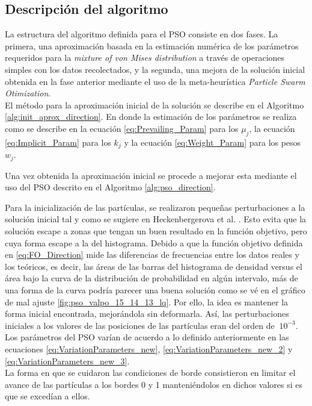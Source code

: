 \subsection{Descripción del algoritmo}
La estructura del algoritmo definida para el PSO consiste en dos fases. La primera, una aproximación basada en la estimación numérica de los parámetros requeridos para la \emph{mixture of von Mises distribution} a través de operaciones simples con los datos recolectados, y la segunda, una mejora de la solución inicial obtenida en la fase anterior mediante el uso de la meta-heurística \emph{Particle Swarm Otimization}. \\
El método para la aproximación inicial de la solución se describe en el Algoritmo \ref{alg:init_aprox_direction}.
En donde la estimación de los parámetros se realiza como se describe en la ecuación \ref{eq:Prevailing_Param} para los $\mu_j$, la ecuación \ref{eq:Implicit_Param} para los $k_j$ y  la ecuación \ref{eq:Weight_Param} para los pesos $w_j$.

Una vez obtenida la aproximación inicial se procede a mejorar esta mediante el uso del PSO descrito en el Algoritmo \ref{alg:pso_direction}.

Para la inicialización de las partículas, se realizaron pequeñas perturbaciones a la solución inicial tal y como se sugiere en Heckenbergerova et al. \cite{Heckenbergerova15}. Esto evita que la solución escape a zonas que tengan un buen resultado en la función objetivo, pero cuya forma escape a la del histograma. Debido a que la función objetivo definida en \ref{eq:FO_Direction} mide las diferencias de frecuencias entre los datos reales y los teóricos, es decir, las áreas de las barras del histograma de densidad versus el área bajo la curva de la distribución de probabilidad en algún intervalo, más de una forma de la curva podría parecer una buena solución como se vé en el gráfico de mal ajuste \ref{fig:pso_valpo_15_14_13_lq}. Por ello, la idea es mantener la forma inicial encontrada, mejorándola sin deformarla. Así, las perturbaciones iniciales a los valores de las posiciones de las partículas eran del orden de $~ 10^{-3}$.\\
Los parámetros del PSO varían de acuerdo a lo definido anteriormente en las ecuaciones \ref{eq:VariationParameters_new}, \ref{eq:VariationParameters_new_2} y \ref{eq:VariationParameters_new_3}.\\
La forma en que se cuidaron las condiciones de borde consistieron en limitar el avance de las partículas a los bordes 0 y 1 manteniéndolos en dichos valores si es que se excedían a ellos.\\
